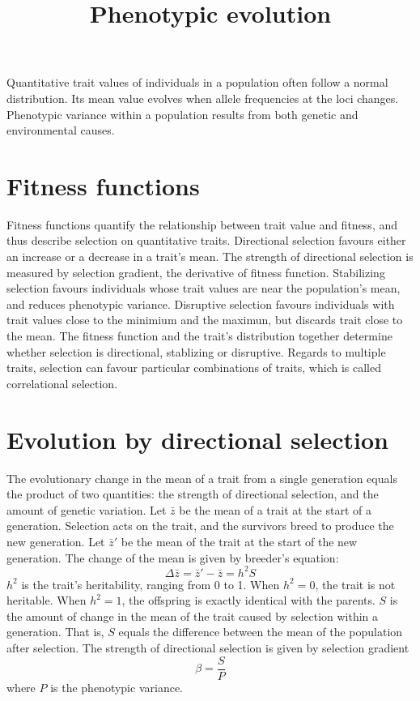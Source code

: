 \documentclass[11pt]{article}
\title{Phenotypic evolution}
\author{}
\date{}
\begin{document}
\begin{sloppypar}
  \maketitle

  \linenumbers
Quantitative trait values of individuals in a population often follow a normal distribution. 
Its mean value evolves when allele frequencies at the loci changes. 
Phenotypic variance within a population results from both genetic and environmental causes. 

\section{Fitness functions}
Fitness functions quantify the relationship between trait value and fitness, and thus describe selection on quantitative traits. 
Directional selection favours either an increase or a decrease in a trait's mean. 
The strength of directional selection is measured by selection gradient, the derivative of fitness function. 
Stabilizing selection favours individuals whose trait values are near the population's mean, and reduces phenotypic variance. 
Disruptive selection favours individuals with trait values close to the minimium and the maximun, but discards trait close to the mean. 
The fitness function and the trait's distribution together determine whether selection is directional, stablizing or disruptive. 
Regards to multiple traits, selection can favour particular combinations of traits, which is called correlational selection. 

\section{Evolution by directional selection}
The evolutionary change in the mean of a trait from a single generation equals the product of two quantities: the strength of directional selection, and the amount of genetic variation. 
Let $\bar{z}$ be the mean of a trait at the start of a generation. 
Selection acts on the trait, and the survivors breed to produce the new generation. 
Let $\bar{z}'$ be the mean of the trait at the start of the new generation. 
The change of the mean is given by breeder's equation: 
\begin{equation}
  \Delta \bar{z} = \bar{z}' - \bar{z} = h^2 S
\end{equation}
$h^2$ is the trait's heritability, ranging from 0 to 1. 
When $h^2=0$, the trait is not heritable. 
When $h^2=1$, the offspring is exactly identical with the parents. 
$S$ is the amount of change in the mean of the trait caused by selection within a generation. 
That is, $S$ equals the difference between the mean of the population after selection. 
The strength of directional selection is given by selection gradient 
\begin{equation}
  \beta = \frac{S}{P}
\end{equation}
where $P$ is the phenotypic variance. 


\end{sloppypar}
\end{document}
